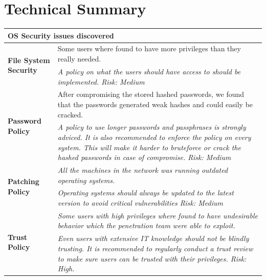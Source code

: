 \section{Technical Summary}

\begin{table}[h]
\begin{tabular}{|l|p{10.5cm}|} 
\hline
\multicolumn{2}{|l|}{OS Security issues discovered}                              \\ \hline
\multirow{2}{*}{\textbf{File System Security}} & Some users where found to have more privileges than they really needed.      \\ \cline{2-2} 
                                               & \textit{A policy on what the users should have access to should be implemented. Risk: Medium} \\ \hline



\multirow{2}{*}{\textbf{Password Policy}} &  After compromising the stored hashed passwords, we found that the passwords generated weak hashes and could easily be cracked.    \\ \cline{2-2} 
                                               & \textit{A policy to use longer passwords and passphrases is strongly adviced. It is also recommended to enforce the policy on every system. This will make it harder to bruteforce or crack the hashed passwords in case of compromise. Risk: Medium} \\ \hline



\multirow{2}{*}{\textbf{Patching Policy}} & \textit{All the machines in the network was running outdated operating systems.}    \\ \cline{2-2} 
                                               & \textit{Operating systems should always be updated to the latest version to avoid critical vulnerabilities Risk: Medium } \\ \hline



\multirow{2}{*}{\textbf{Trust Policy}} & \textit{Some users with high privileges where found to have undesirable behavior which the penetration team were able to exploit.}    \\ \cline{2-2} 
                                               & \textit{Even users with extensive IT knowledge should not be blindly trusting. It is recommended to regularly conduct a trust review to make sure users can be trusted with their privileges. Risk: High.} \\ \hline

\end{tabular}
\end{table}

